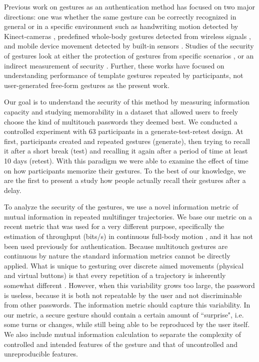 \documentclass{sig-alternate-10pt}
\begin{document}
Previous work on gestures as an authentication method has focused on two major directions: one was whether the same gesture can be correctly recognized in general \cite{touchalytics,Sae-Bae:2012:BGN:2207676.2208543} or in  a specific environment such as handwriting motion detected by Kinect-cameras \cite{kinwrite}, predefined whole-body gestures detected from wireless signals \cite{Pu:2013:WGR:2500423.2500436}, and mobile device movement detected by built-in sensors \cite{Ruiz:2011:UMG:1978942.1978971}. Studies of the security of gestures look at either the protection of gestures from specific scenarios \cite{Zakaria:2011:SSD:2078827.2078835,Schaub:2013:EDS:2501604.2501615,kinwrite,DeLuca:2013:BAS:2470654.2481330}, or an indirect measurement of security \cite{Grandhi:2011:UNI:1978942.1979061,Oh:2013:CPE:2470654.2466145}. Further, these works have focused on understanding performance of template gestures repeated by participants, not user-generated free-form gestures as the present work. 

Our goal is to understand the security of this method by measuring information capacity and studying memorability in a dataset that allowed users to freely choose the kind of multitouch passwords they deemed best.
We conducted a controlled experiment with 63 participants in a generate-test-retest design. 
At first, participants created and repeated gestures (generate), then trying to recall it after a short break (test) and recalling it again after a period of time at least 10 days (retest). With this paradigm we were able to examine the effect of time on how participants memorize their gestures. To the best of our knowledge, we are the first to present a study how people actually recall their gestures after a delay. 

To analyze the security of the gestures, we use a novel information metric of mutual information in repeated multifinger trajectories.  We base our metric on a recent metric that was used for a very different purpose, specifically the estimation of throughput (bits/s) in continuous full-body motion \cite{oulasvirta2013information}, and it has not been used previously for authentication.
Because multitouch gestures are continuous by nature the standard information metrics cannot be directly applied. What is unique to gesturing over discrete aimed movements (physical and virtual buttons) is that every repetition of a trajectory is inherently somewhat different \cite{jones2006human}. However, when this variability grows too large, the password is useless, because it is both not repeatable by the user and not discriminable from other passwords. 
The information metric should capture this variability. 
In our metric, a secure gesture should contain a certain amount of ``surprise", i.e. some turns or changes, while still being able to be reproduced by the user itself. We also include mutual information calculation to separate the complexity of controlled and intended features of the gesture and that of uncontrolled and unreproducible features. 
\end{document}
